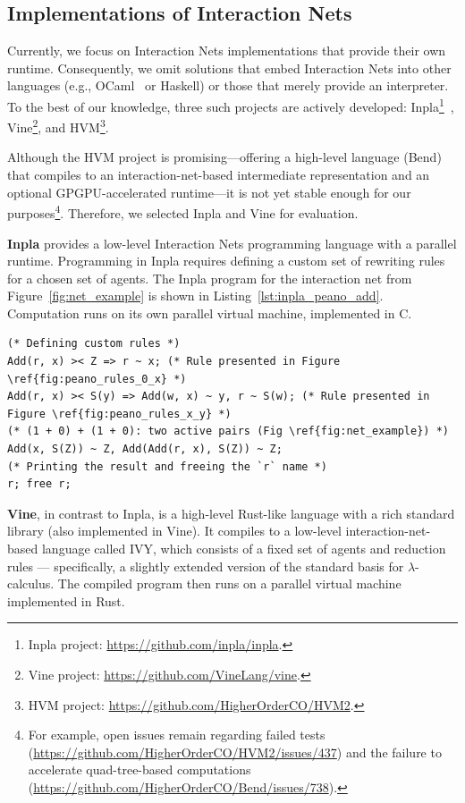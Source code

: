 \subsection{Implementations of Interaction Nets}

Currently, we focus on Interaction Nets implementations that provide their own runtime.
Consequently, we omit solutions that embed Interaction Nets into other languages (e.g., OCaml~\cite{Huber_2025} or Haskell) or those that merely provide an interpreter.
To the best of our knowledge, three such projects are actively developed: Inpla\footnote{Inpla project: \url{https://github.com/inpla/inpla}.}~\cite{DBLP:journals/corr/MackieS16}, Vine\footnote{Vine project: \url{https://github.com/VineLang/vine}.}, and HVM\footnote{HVM project: \url{https://github.com/HigherOrderCO/HVM2}.}.

Although the HVM project is promising---offering a high-level language (Bend) that compiles to an interaction-net-based intermediate representation and an optional GPGPU-accelerated runtime---it is not yet stable enough for our purposes\footnote{For example, open issues remain regarding failed tests (\url{https://github.com/HigherOrderCO/HVM2/issues/437}) and the failure to accelerate quad-tree-based computations (\url{https://github.com/HigherOrderCO/Bend/issues/738}).}.
Therefore, we selected Inpla and Vine for evaluation.

\textbf{Inpla} provides a low-level Interaction Nets programming language with a parallel runtime.
Programming in Inpla requires defining a custom set of rewriting rules for a chosen set of agents.
The Inpla program for the interaction net from Figure~\ref{fig:net_example} is shown in Listing~\ref{lst:inpla_peano_add}. 
Computation runs on its own parallel virtual machine, implemented in C.

\begin{listing}[H]
\begin{verbatim}
(* Defining custom rules *)
Add(r, x) >< Z => r ~ x; (* Rule presented in Figure \ref{fig:peano_rules_0_x} *)
Add(r, x) >< S(y) => Add(w, x) ~ y, r ~ S(w); (* Rule presented in Figure \ref{fig:peano_rules_x_y} *)
(* (1 + 0) + (1 + 0): two active pairs (Fig \ref{fig:net_example}) *)
Add(x, S(Z)) ~ Z, Add(Add(r, x), S(Z)) ~ Z;
(* Printing the result and freeing the `r` name *)
r; free r;
\end{verbatim}
\caption{Peano numerals addition in Inpla}
\label{lst:inpla_peano_add}
\end{listing}

\textbf{Vine}, in contrast to Inpla, is a high-level Rust-like language with a rich standard library (also implemented in Vine). It compiles to a low-level interaction-net-based language called IVY, which consists of a fixed set of agents and reduction rules — specifically, a slightly extended version of the standard basis for $\lambda$-calculus.
The compiled program then runs on a parallel virtual machine implemented in Rust.